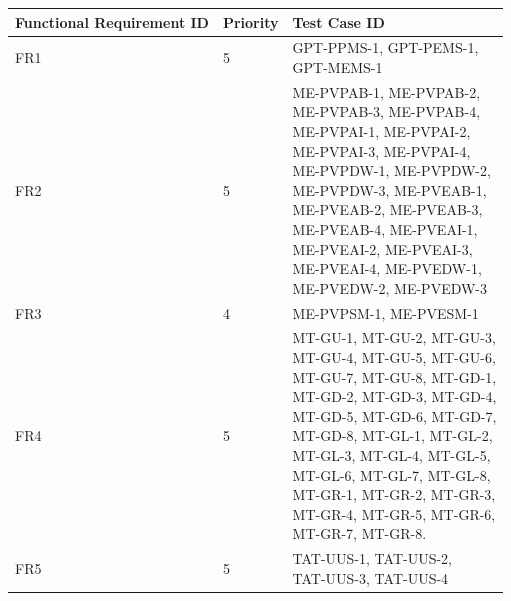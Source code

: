 \documentclass[12pt, titlepage]{article}
\begin{document}
\begin{table}[ht]
\begin{tabular}{|p{3cm}|p{3cm}|p{7cm}|}
 \hline
 Functional Requirement ID & Priority & Test Case ID\\
 \hline
 FR1 & 5 & \makecell[l]{GPT-PPMS-1, GPT-PEMS-1,\\ GPT-MEMS-1}\\ 
 \hline
 FR2 & 5 & \makecell[l]{ME-PVPAB-1, ME-PVPAB-2,\\ ME-PVPAB-3, ME-PVPAB-4,\\ ME-PVPAI-1, ME-PVPAI-2,\\ ME-PVPAI-3, ME-PVPAI-4,\\ ME-PVPDW-1, ME-PVPDW-2,\\ ME-PVPDW-3, ME-PVEAB-1,\\ ME-PVEAB-2, ME-PVEAB-3,\\ ME-PVEAB-4, ME-PVEAI-1,\\ ME-PVEAI-2, ME-PVEAI-3,\\ ME-PVEAI-4, ME-PVEDW-1,\\ ME-PVEDW-2, ME-PVEDW-3}\\
 \hline
 FR3 & 4 & ME-PVPSM-1, ME-PVESM-1\\
 \hline
 FR4 & 5 & \makecell[l]{MT-GU-1, MT-GU-2, MT-GU-3,\\ MT-GU-4, MT-GU-5, MT-GU-6,\\ MT-GU-7, MT-GU-8, MT-GD-1,\\ MT-GD-2, MT-GD-3, MT-GD-4,\\ MT-GD-5, MT-GD-6, MT-GD-7,\\ MT-GD-8, MT-GL-1, MT-GL-2,\\ MT-GL-3, MT-GL-4, MT-GL-5,\\ MT-GL-6, MT-GL-7, MT-GL-8,\\ MT-GR-1, MT-GR-2, MT-GR-3,\\ MT-GR-4, MT-GR-5, MT-GR-6,\\ MT-GR-7, MT-GR-8.}\\
 \hline
FR5 & 5 & \makecell[l]{TAT-UUS-1, TAT-UUS-2,\\ TAT-UUS-3, TAT-UUS-4}\\
\hline
 \end{tabular}
\end{table}
\end{document}
